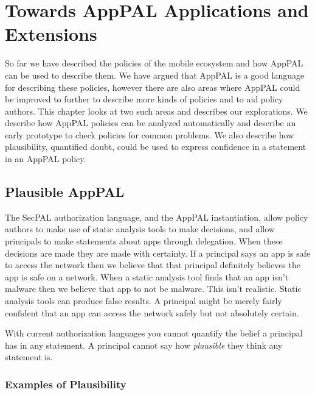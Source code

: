 \documentclass[thesis.tex]{subfiles}
\begin{document}
\chapter{Towards AppPAL Applications and Extensions}
\label{chap:extensions}

So far we have described the policies of the mobile
ecosystem and how AppPAL can be used to describe them.  We have argued
that AppPAL is a good language for describing these policies, however
there are also areas where AppPAL could be improved to further to
describe more kinds of policies and to aid policy authors.  This
chapter looks at two such areas and describes our
explorations.  We describe how AppPAL policies can
be analyzed automatically and describe an early prototype to check
policies for common problems.  We also describe
how plausibility, quantified doubt, could be used to express
confidence in a statement in an AppPAL policy.


\section{Plausible AppPAL}

\newcommand{\secpalmath}[1]{\ensuremath\texttt{#1}}
\newcommand{\AC}[0]{\ensuremath\text{AC}}
\newcommand{\says}[1]{\ensuremath~\secpalmath{says}^{\new{#1}}~}
\newcommand{\canSay}[1]{\secpalmath{can-say}_{#1}}
\newcommand{\canActAs}[0]{\secpalmath{can-act-as}}
\newcommand{\spif}[0]{\secpalmath{if}}
\newcommand{\where}[0]{\secpalmath{where}}

The SecPAL authorization language, and the AppPAL instantiation, allow
policy authors to make use of static analysis tools to make decisions,
and allow principals to make statements about apps through delegation.
When these decisions are made they are made with certainty.  If a
principal says an app is safe to access the network then we believe
that that principal definitely believes the app is safe on a network.
When a static analysis tool finds that an app isn't malware then we
believe that app to not be malware.  This isn't realistic.  Static
analysis tools can produce false results.  A principal might be merely
fairly confident that an app can access the network safely but not absolutely
certain.

With current authorization languages you cannot quantify the belief a principal
has in any statement. A principal cannot say how \emph{plausible} they think any
statement is.

\subsection{Examples of Plausibility}
\end{document}
